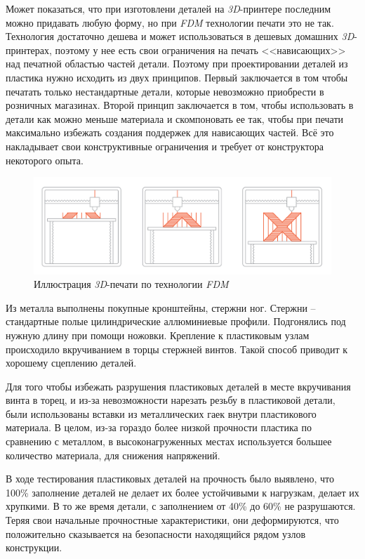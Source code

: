 Может показаться, что при изготовлени деталей на \textit{3D}-принтере последним можно придавать любую форму, но при \textit{FDM} технологии печати это не так. Технология достаточно дешева и может использоваться в дешевых домашних \textit{3D}-принтерах, поэтому у нее есть свои ограничения на печать <<нависающих>> над печатной областью частей детали. Поэтому при проектировании деталей из пластика нужно исходить из двух принципов. Первый заключается в том чтобы печатать только нестандартные детали, которые невозможно приобрести в розничных магазинах. Второй принцип заключается в том, чтобы использовать в детали как можно меньше материала и скомпоновать ее так, чтобы при печати максимально избежать создания поддержек для нависающих частей. Всё это накладывает свои конструктивные ограничения и требует от конструктора некоторого опыта.

\begin{figure}[h]
    \centering
    \includegraphics[scale=0.3]{chapter_mechanics_construction/figure1.png}
    \caption{Иллюстрация \textit{3D}-печати по технологии \textit{FDM}}
    \label{}
\end{figure}

Из металла выполнены покупные кронштейны, стержни ног. Стержни -- стандартные полые цилиндрические аллюминиевые профили. Подгонялись под нужную длину при помощи ножовки. Крепление к пластиковым узлам происходило вкручиванием в торцы стержней винтов. Такой способ приводит к хорошему сцеплению деталей.

Для того чтобы избежать разрушения пластиковых деталей в месте вкручивания винта в торец, и из-за невозможности нарезать резьбу в пластиковой детали, были использованы вставки из металлических гаек внутри пластикового материала. В целом, из-за гораздо более низкой прочности пластика по сравнению с металлом, в высоконагруженных местах используется большее количество материала, для снижения напряжений.

В ходе тестирования пластиковых деталей на прочность было выявлено, что 100\% заполнение деталей не делает их более устойчивыми к нагрузкам, делает их хрупкими. В то же время детали, с заполнением от 40\% до 60\% не разрушаются. Теряя свои начальные прочностные характеристики, они деформируются, что положительно сказывается на безопасности находящийся рядом узлов конструкции.


